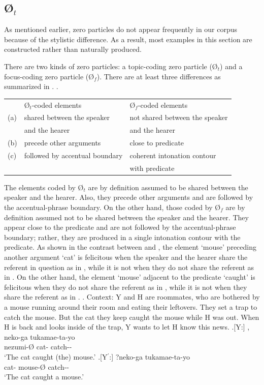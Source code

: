 \subsection{{\O$_{t}$}}\label{TopZero}

As mentioned earlier,
zero particles do not appear frequently in our corpus
because of the stylistic difference.
As a result,
most examples in this section are constructed rather than naturally produced.

There are two kinds of zero particles:
a topic-coding zero particle ({\O$_{t}$}) and a focus-coding zero particle ({\O$_{f}$}).
There are at least three differences as summarized in \Next \cite[see also][]{niwa06,nakagawasato12}.
%
\ex.
\begin{tabular}{lll}
 & {\O$_{t}$}-coded elements & {\O$_{f}$}-coded elements \\
 (a) & shared between the speaker & not shared between the speaker \\
 & and the hearer & and the hearer \\
 (b) & precede other arguments & close to predicate \\
 (c) & followed by accentual boundary & coherent intonation contour\\
 &   &  with predicate \\
\end{tabular}

The elements coded by {\O$_{t}$} are by definition assumed to be shared between the speaker and the hearer.
Also, they precede other arguments and are followed by the accentual-phrase boundary.
On the other hand,
those coded by {\O$_{f}$} are by definition assumed not to be shared between the speaker and the hearer.
They appear close to the predicate and are not followed by the accentual-phrase boundary;
rather, they are produced in a single intonation contour with the predicate.
As shown in the contrast between \Next and \NNext,
the element  `mouse' preceding another argument  `cat' is felicitous when the speaker and the hearer share the referent in question as in \Next[Y],
while it is not when they do not share the referent as in \NNext[Y].
On the other hand,
the element `mouse' adjacent to the predicate  `caught' is felicitous when they do not share the referent as in \NNext[Y$^{\prime}$],
while it is not when they share the referent as in \Next[Y$^{\prime}$].
%
\ex. Context: Y and H are roommates,
	who are bothered by a mouse running around their room
	and eating their leftovers.
	They set a trap to catch the mouse.
	But the cat they keep caught the mouse while H was out.
	When H is back and looks inside of the trap,
	Y wants to let H know this news.
	\ag.[Y:] , neko-ga tukamae-ta-yo \\
		nezumi-{\O} cat- catch-- \\
		`The cat caught (the) mouse.'
	\bg.[Y$^{\prime}$:] ?neko-ga  tukamae-ta-yo \\
		cat- mouse-{\O} catch-- \\
		`The cat caught a mouse.'

